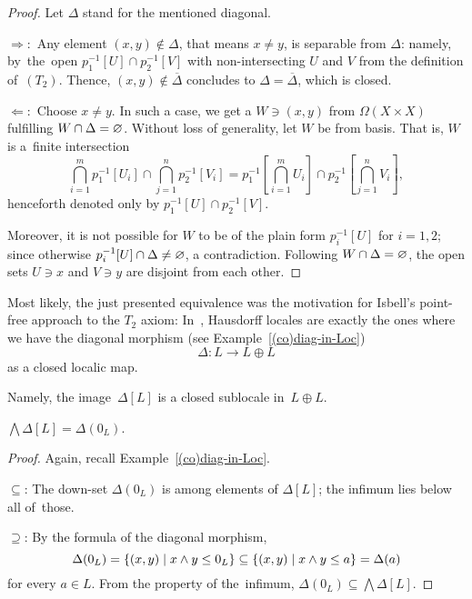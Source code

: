 \begin{proof}
  Let $\Delta$ stand for the mentioned diagonal.

  $\Rightarrow:$ Any element $(x, y)\not\in \Delta$, that means $x \ne y$, is
  separable from $\Delta$:
  namely, by~the~open $p_1^{-1}[U] \cap p_2^{-1}[V]$ with non-intersecting $U$
  and $V$ from the definition of~$(T_2)$.
  Thence, $(x, y)\not\in \overline{\Delta}$ concludes to $\Delta =
  \overline{\Delta}$, which is closed.

  $\Leftarrow:$ Choose $x \ne y$.
  In such a case, we get a $W\owns (x, y)$ from $\Omega(X\times X)$ fulfilling
  $W \cap \Delta = \varnothing$.
  Without loss of generality, let $W$ be from basis.
  That is, $W$ is a~finite intersection
  \[
    \bigcap_{i=1}^m p_1^{-1}[U_i] \cap \bigcap_{j=1}^n p_2^{-1}[V_i] =
    p_1^{-1}[\bigcap_{i=1}^m U_i] \cap p_2^{-1}[\bigcap_{j=1}^n V_i],
  \]
  henceforth denoted only by $p_1^{-1}[U] \cap p_2^{-1}[V]$.

  Moreover, it is not possible for $W$ to be of the plain form $p_i^{-1}[U]$
  for $i = 1, 2$;
  since otherwise $p_i^{-1}[U] \cap \Delta \ne \varnothing$, a contradiction.
  Following $W \cap \Delta = \varnothing$, the open sets $U\owns x$ and $V\owns y$
  are disjoint from each other.
\end{proof}

Most likely, the just presented equivalence was the motivation for Isbell's
point-free approach to the $T_2$ axiom:
In~\cite{isbell72}, Hausdorff locales are exactly the ones where we have the
diagonal morphism (see Example~\ref{(co)diag-in-Loc})
\[
  \Delta\colon L \to L \oplus L
\]
as a closed localic map.

Namely, the image~$\Delta[L]$ is a closed sublocale in~$L \oplus L$.

\begin{lem}
  $\bigwedge \Delta[L] = \Delta(0_L)$.
\end{lem}

\begin{proof}
  Again, recall Example~\ref{(co)diag-in-Loc}\thinspace.

  $\subseteq$: The down-set $\Delta(0_L)$ is among elements of $\Delta[L]$; the
  infimum lies below all of~those.

  $\supseteq$: By the formula of the diagonal morphism,
  \[
    \Delta(0_L)
    = \left\{(x, y) \mid x \wedge y \leq 0_L \right\}
    \subseteq \left\{(x, y) \mid x \wedge y \leq a \right\}
    = \Delta(a)
  \]
  for every $a\in L$.
  From the property of the~infimum, $\Delta(0_L) \subseteq \bigwedge
  \Delta[L]$.
\end{proof}

